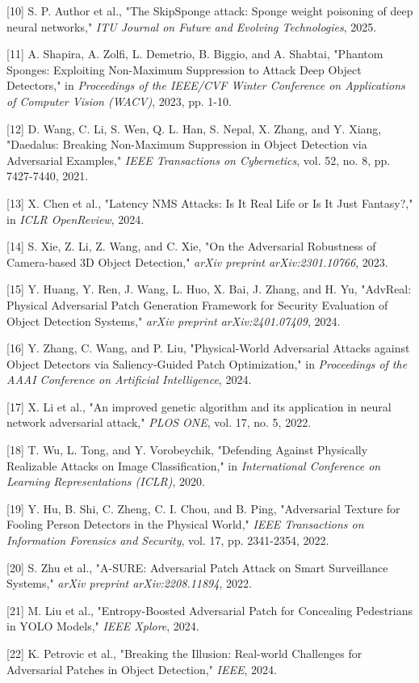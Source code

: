 \documentclass[]{article}
\begin{document}
{[}10{]} S. P. Author et al., "The SkipSponge attack: Sponge weight
poisoning of deep neural networks," \emph{ITU Journal on Future and
Evolving Technologies}, 2025.

{[}11{]} A. Shapira, A. Zolfi, L. Demetrio, B. Biggio, and A. Shabtai,
"Phantom Sponges: Exploiting Non-Maximum Suppression to Attack Deep
Object Detectors," in \emph{Proceedings of the IEEE/CVF Winter
Conference on Applications of Computer Vision (WACV)}, 2023, pp. 1-10.

{[}12{]} D. Wang, C. Li, S. Wen, Q. L. Han, S. Nepal, X. Zhang, and Y.
Xiang, "Daedalus: Breaking Non-Maximum Suppression in Object Detection
via Adversarial Examples," \emph{IEEE Transactions on Cybernetics}, vol.
52, no. 8, pp. 7427-7440, 2021.

{[}13{]} X. Chen et al., "Latency NMS Attacks: Is It Real Life or Is It
Just Fantasy?," in \emph{ICLR OpenReview}, 2024.

{[}14{]} S. Xie, Z. Li, Z. Wang, and C. Xie, "On the Adversarial
Robustness of Camera-based 3D Object Detection," \emph{arXiv preprint
arXiv:2301.10766}, 2023.

{[}15{]} Y. Huang, Y. Ren, J. Wang, L. Huo, X. Bai, J. Zhang, and H. Yu,
"AdvReal: Physical Adversarial Patch Generation Framework for Security
Evaluation of Object Detection Systems," \emph{arXiv preprint
arXiv:2401.07409}, 2024.

{[}16{]} Y. Zhang, C. Wang, and P. Liu, "Physical-World Adversarial
Attacks against Object Detectors via Saliency-Guided Patch
Optimization," in \emph{Proceedings of the AAAI Conference on Artificial
Intelligence}, 2024.

{[}17{]} X. Li et al., "An improved genetic algorithm and its
application in neural network adversarial attack," \emph{PLOS ONE}, vol.
17, no. 5, 2022.

{[}18{]} T. Wu, L. Tong, and Y. Vorobeychik, "Defending Against
Physically Realizable Attacks on Image Classification," in
\emph{International Conference on Learning Representations (ICLR)},
2020.

{[}19{]} Y. Hu, B. Shi, C. Zheng, C. I. Chou, and B. Ping, "Adversarial
Texture for Fooling Person Detectors in the Physical World," \emph{IEEE
Transactions on Information Forensics and Security}, vol. 17, pp.
2341-2354, 2022.

{[}20{]} S. Zhu et al., "A-SURE: Adversarial Patch Attack on Smart
Surveillance Systems," \emph{arXiv preprint arXiv:2208.11894}, 2022.

{[}21{]} M. Liu et al., "Entropy-Boosted Adversarial Patch for
Concealing Pedestrians in YOLO Models," \emph{IEEE Xplore}, 2024.

{[}22{]} K. Petrovic et al., "Breaking the Illusion: Real-world
Challenges for Adversarial Patches in Object Detection," \emph{IEEE},
2024.
\end{document}
